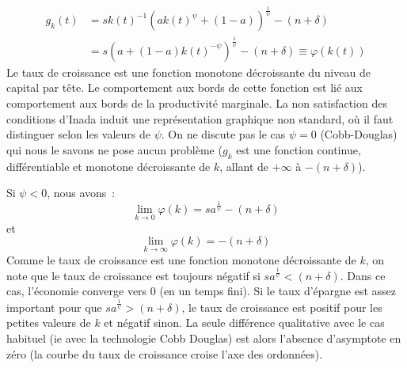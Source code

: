 \documentclass[11pt,a4paper,notitlepage]{article}
\begin{document}
\[
  \begin{split}
    g_k(t) &= s k(t)^{-1}\left(ak(t)^{\psi} + (1-a)\right)^{\frac{1}{\psi}} - (n+\delta)\\
    &=  s \left(a + (1-a)k(t)^{-\psi}\right)^{\frac{1}{\psi}} - (n+\delta)  \equiv  \varphi (k(t))
  \end{split}
\]
Le taux de croissance est une fonction monotone décroissante du niveau de capital par tête. Le comportement aux bords de cette fonction est lié aux comportement aux bords de la productivité marginale. La non satisfaction des conditions d'Inada induit une représentation graphique non standard, où il faut distinguer selon les valeurs de $\psi$. On ne discute pas le cas $\psi=0$ (Cobb-Douglas) qui nous le savons ne pose aucun problème ($g_k$ est une fonction continue, différentiable et monotone décroissante de $k$, allant de $+\infty$ à $-(n+\delta)$).\newline

Si $\psi<0$, nous avons :
\[
  \lim_{k\rightarrow 0}\varphi(k) = s a^\frac{1}{\psi}-(n+\delta)
\]
et
\[
  \lim_{k\rightarrow\infty}\varphi(k) = -(n+\delta)
\]
Comme le taux de croissance est une fonction monotone décroissante de $k$, on note que le taux de croissance est toujours négatif si $s a^\frac{1}{\psi}<(n+\delta)$. Dans ce cas, l'économie converge vers 0 (en un temps fini). Si le taux d'épargne est assez important pour que $s a^\frac{1}{\psi}>(n+\delta)$, le taux de croissance est positif pour les petites valeurs de $k$ et négatif sinon. La seule différence qualitative avec le cas habituel (ie avec la technologie Cobb Douglas) est alors l'absence d'asymptote en zéro (la courbe du taux de croissance croise l'axe des ordonnées).\newline
\end{document}
